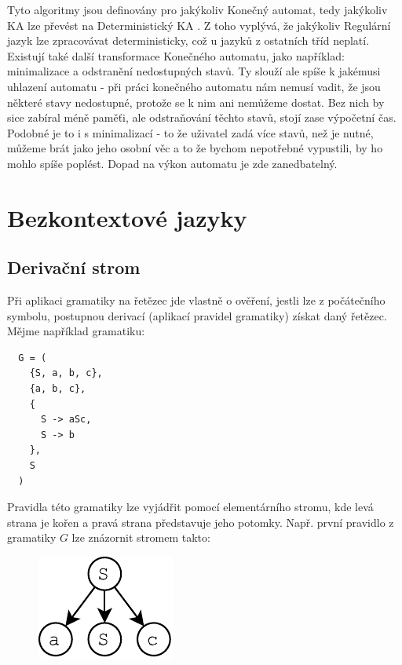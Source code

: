 \vspace{0.5cm}

Tyto algoritmy jsou definovány pro jakýkoliv Konečný automat, tedy jakýkoliv KA
lze převést na Deterministický KA \cite[str. 39]{MedunaIFJ}.
Z toho vyplývá, že jakýkoliv Regulární jazyk lze zpracovávat deterministicky,
což u jazyků z ostatních tříd  neplatí.\\

Existují také další transformace Konečného automatu, jako například:
minimalizace a odstranění nedostupných stavů. Ty slouží ale spíše k
jakémusi uhlazení automatu - při práci konečného automatu nám nemusí vadit,
že jsou některé stavy nedostupné, protože se k nim ani nemůžeme dostat.
Bez nich by sice zabíral méně paměťi, ale odstraňování těchto stavů, stojí
zase výpočetní čas.\\
Podobné je to i s minimalizací - to že uživatel
zadá více stavů, než je nutné, můžeme brát jako jeho osobní věc a to že bychom
nepotřebné vypustili, by ho mohlo spíše poplést. Dopad na výkon automatu je
zde zanedbatelný.

\section{Bezkontextové jazyky}

\subsection{Derivační strom}
Při aplikaci gramatiky na řetězec jde vlastně o ověření,
jestli lze z počátečního symbolu,
postupnou derivací (aplikací pravidel gramatiky) získat daný řetězec.
Mějme například gramatiku:

\begin{lstlisting}
  G = (
    {S, a, b, c},
    {a, b, c},
    {
      S -> aSc,
      S -> b
    },
    S
  )
\end{lstlisting}
\noindent
Pravidla této gramatiky lze vyjádřit pomocí elementárního stromu,
kde levá strana je kořen a pravá strana představuje jeho potomky.
Např. první pravidlo z gramatiky $G$ lze znázornit stromem takto:
\begin{figure}[H]
  \centering
  \includegraphics{fig/RuleTree1.pdf}
\end{figure}

